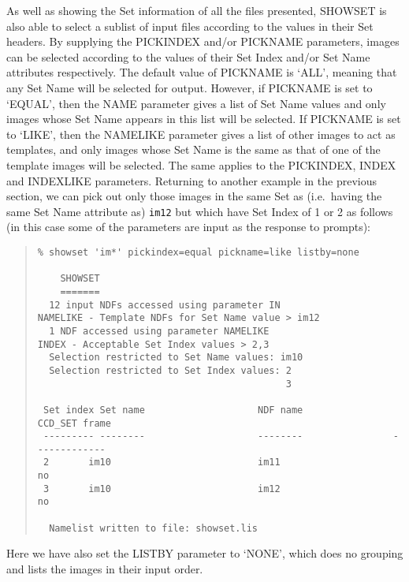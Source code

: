 \documentclass[twoside,11pt]{article}
\renewcommand{\_}{\texttt{\symbol{95}}}
\newenvironment{myquote}{\begin{quote}\begin{small}}{\end{small}\end{quote}}
\newcommand{\text}[1]{{\small \tt #1}}
\newcommand{\routine}[1]{{\sc #1}}
\begin{document}
As well as showing the Set information of all the files presented,
\routine{SHOWSET} is also able to 
select a sublist of input files according to the values in their
Set headers.  
By supplying the PICKINDEX and/or PICKNAME parameters,
images can be selected according
to the values of their Set Index and/or Set Name attributes
respectively.
The default value of PICKNAME is `ALL', meaning that any Set Name
will be selected for output.
However, if PICKNAME is set to `EQUAL', then the
NAME parameter gives a list of Set Name values and only
images whose Set Name appears in this list will be selected.
If PICKNAME is set to `LIKE', then the
NAMELIKE parameter gives a list of other images to act as templates,
and only images whose Set Name is the same as that of one of the template
images will be selected.
The same applies to the PICKINDEX, INDEX and INDEXLIKE parameters.
Returning to another example in the previous section, 
we can pick out only those images in the same Set as (i.e.\ having
the same Set Name attribute as) \text{im12}
but which have Set Index of 1 or 2 as follows 
(in this case some of the parameters are input as the response to prompts):
\begin{myquote}
\begin{verbatim}
% showset 'im*' pickindex=equal pickname=like listby=none

    SHOWSET
    =======
  12 input NDFs accessed using parameter IN
NAMELIKE - Template NDFs for Set Name value > im12
  1 NDF accessed using parameter NAMELIKE
INDEX - Acceptable Set Index values > 2,3
  Selection restricted to Set Name values: im10
  Selection restricted to Set Index values: 2
                                            3

 Set index Set name                    NDF name                CCD_SET frame
 --------- --------                    --------                -------------
 2       im10                          im11                          no
 3       im10                          im12                          no

  Namelist written to file: showset.lis
\end{verbatim}
\end{myquote}
Here we have also set the LISTBY parameter to `NONE', which does
no grouping and lists the images in their input order.
\end{document}
